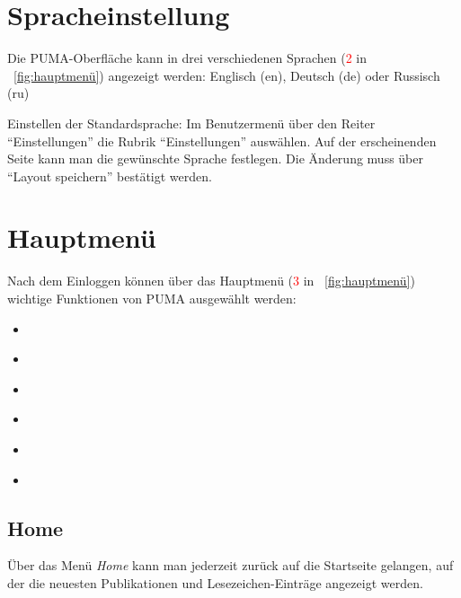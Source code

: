 \section{Spracheinstellung}
\label{sec:spracheinstellung}
Die PUMA-Oberfläche kann in drei verschiedenen Sprachen (\textcolor{red}{2} in ~\autoref{fig:hauptmenü})  angezeigt werden:
Englisch (en), Deutsch (de) oder Russisch (ru)
\begin{tip} 
Einstellen der Standardsprache: Im Benutzermenü über den Reiter \enquote{Einstellungen} die Rubrik \enquote{Einstellungen} auswählen. Auf der erscheinenden Seite kann man die gewünschte Sprache festlegen. Die Änderung muss über \enquote{Layout speichern} bestätigt werden.
\end{tip}
\section{Hauptmenü}
\label{sec:hauptmenue}
Nach dem Einloggen können über das Hauptmenü (\textcolor{red}{3} in ~\autoref{fig:hauptmenü}) wichtige Funktionen von PUMA ausgewählt werden:
\begin{itemize}
\item ~
\item ~
\item ~
\item ~
\item ~
\item ~
\end{itemize}

\subsection{Home}
\label{subsec:home}
Über das Menü \textit{Home} kann man jederzeit zurück auf die Startseite gelangen, auf der die neuesten Publikationen und Lesezeichen-Einträge angezeigt werden.

